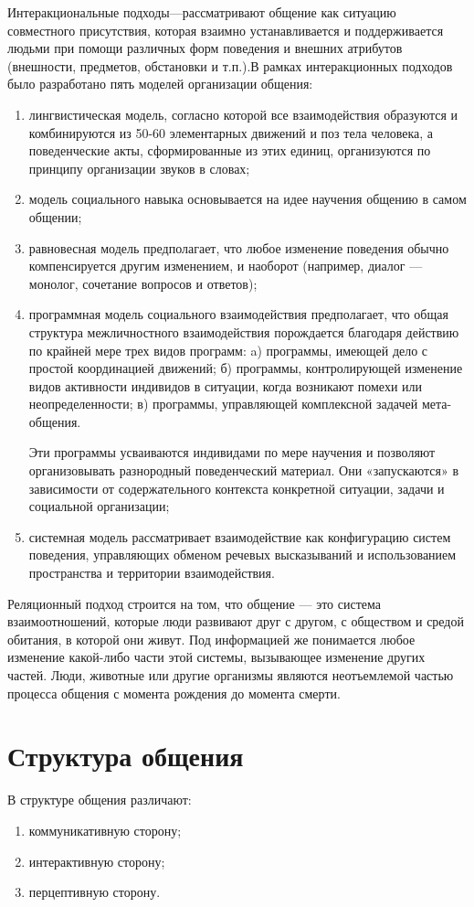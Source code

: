 Интеракциональные подходы—рассматривают общение как ситуацию совместного присутствия, которая взаимно устанавливается и поддерживается людьми при помощи различных форм поведения и внешних атрибутов (внешности, предметов, обстановки и т.п.).В рамках интеракционных подходов было разработано пять моделей организации общения:
\begin{enumerate}
	\item лингвистическая модель, согласно которой все взаимодействия образуются и комбинируются из 50-60 элементарных движений и поз тела человека, а поведенческие акты, сформированные из этих единиц, организуются по принципу организации звуков в словах;
	\item модель социального навыка основывается на идее научения общению в самом общении;
	\item равновесная модель предполагает, что любое изменение поведения обычно компенсируется другим изменением, и наоборот (например, диалог — монолог, сочетание вопросов и ответов);
	\item программная модель социального взаимодействия предполагает, что общая структура межличностного взаимодействия порождается благодаря действию по крайней мере трех видов программ:
		\subitem a) программы, имеющей дело с простой координацией движений;
		\subitem б) программы, контролирующей изменение видов активности индивидов в ситуации, когда возникают помехи или неопределенности;
		\subitem в) программы, управляющей комплексной задачей мета-общения.
		
	Эти программы усваиваются индивидами по мере научения и позволяют организовывать разнородный поведенческий материал. Они «запускаются» в зависимости от содержательного контекста конкретной ситуации, задачи и социальной организации;
	\item системная модель рассматривает взаимодействие как конфигурацию систем поведения, управляющих обменом речевых высказываний и использованием пространства и территории взаимодействия.
\end{enumerate}

Реляционный подход строится на том, что общение — это система взаимоотношений, которые люди развивают друг с другом, с обществом и средой обитания, в которой они живут. Под информацией же понимается любое изменение какой-либо части этой системы, вызывающее изменение других частей. Люди, животные или другие организмы являются неотъемлемой частью процесса общения с момента рождения до момента смерти.

\section{Структура общения}
В структуре общения различают: \cite{28}
\begin{enumerate}
	\item коммуникативную сторону;
	\item интерактивную сторону;
	\item перцептивную сторону.
\end{enumerate}

